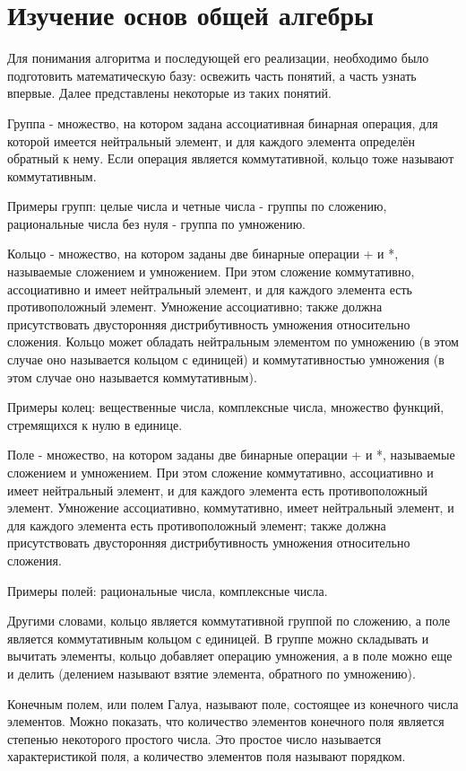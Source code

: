 \chapter{Изучение основ общей алгебры} \label{ch1}

Для понимания алгоритма и последующей его реализации, необходимо было подготовить математическую базу: освежить часть понятий, а часть узнать впервые. Далее представлены некоторые из таких понятий.


Группа - множество, на котором задана ассоциативная бинарная операция, для которой имеется нейтральный элемент, и для каждого элемента определён обратный к нему. Если операция является коммутативной, кольцо тоже называют коммутативным.


Примеры групп: целые числа и четные числа - группы по сложению, рациональные числа без нуля - группа по умножению.


Кольцо - множество, на котором заданы две бинарные операции + и *, называемые сложением и умножением. При этом сложение коммутативно, ассоциативно и имеет нейтральный элемент, и для каждого элемента есть противоположный элемент. Умножение ассоциативно; также должна присутствовать двусторонняя дистрибутивность умножения относительно сложения. Кольцо может обладать нейтральным элементом по умножению (в этом случае оно называется кольцом с единицей) и коммутативностью умножения (в этом случае оно называется коммутативным).


Примеры колец: вещественные числа, комплексные числа, множество функций, стремящихся к нулю в единице.


Поле - множество, на котором заданы две бинарные операции + и *, называемые сложением и умножением. При этом сложение коммутативно, ассоциативно и имеет нейтральный элемент, и для каждого элемента есть противоположный элемент. Умножение ассоциативно, коммутативно, имеет нейтральный элемент, и для каждого элемента есть противоположный элемент; также должна присутствовать двусторонняя дистрибутивность умножения относительно сложения. 


Примеры полей: рациональные числа, комплексные числа.


Другими словами, кольцо является коммутативной группой по сложению, а поле является коммутативным кольцом с единицей. В группе можно складывать и вычитать элементы, кольцо добавляет операцию умножения, а в поле можно еще и делить (делением называют взятие элемента, обратного по умножению).


Конечным полем, или полем Галуа, называют поле, состоящее из конечного числа элементов. Можно показать, что количество элементов конечного поля является степенью некоторого простого числа. Это простое число называется характеристикой поля, а количество элементов поля называют порядком.


